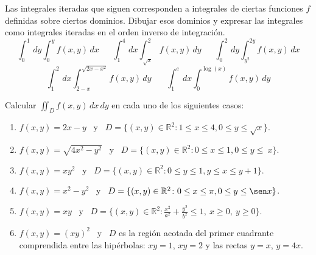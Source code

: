 \documentclass[11pt]{article}
\newcommand{\be}{\begin{enumerate}}
\newcommand{\ee}{\end{enumerate}}
\newcommand{\R}{\mathbb{R}}
\begin{document}
\begin{enumerate}
      \ee
\item Las integrales iteradas que siguen corresponden a integrales
  de ciertas funciones $f$ definidas sobre ciertos dominios. Dibujar
  esos dominios y expresar las integrales como integrales iteradas en
  el orden inverso de integraci\'{o}n. 
\[ 
\int_{0}^{1}\,dy \int_{0}^{y}f(x,y)\,dx \ \ \ \ \ \ \
\int_{1}^{4}\,dx \int_{\sqrt{x}}^{2}f(x,y)\,dy \ \ \ \ \ \ \
\int_{0}^{2}\,dy \int_{y^{2}}^{2y}f(x,y)\,dx 
\]
\[ 
\int_{1}^{2}\,dx \int_{2-x}^{\sqrt{2x-x^{2}}}f(x,y)\,dy \ \ \ \ \ \ \ \ 
\int_{1}^{e}\,dx \int_{0}^{\log(x)}f(x,y)\,dy   
\]
\item Calcular $\iint_{D}f(x,y)\,dx\,dy$ en cada uno de los siguientes
  casos: 
     \be
      \item $f(x,y)=2x-y $ \ y \ $D=\{ (x,y) \in \R^{2}\colon 1\leq x 
            \leq 4 , 0 \leq y \leq \sqrt{x} \}$.
      \item $f(x,y)=\sqrt{4x^{2}-y^{2}} $ \ y \ $D=\{ (x,y) \in 
            \R^{2}\colon 0\leq x \leq 1 ,      0 \leq y \leq \ x \}$. 
      \item $f(x,y)=xy^{2} $ \ y \ $D=\{ (x,y) \in \R^{2}\colon 0\leq
            y \leq 1 , y \leq x \leq  y+1 \}$.
      \item $f(x,y)=x^{2}-y^{2} $ \ y \ $D=\{ (x,y) \in \R^{2}\colon 
            0\leq x \leq \pi ,      0 \leq y \leq \sen x \}$. 
      \item $f(x,y)=xy $ \ y \ $D=\{ (x,y) \in \R^{2}: 
            \frac{x^{2}}{a^{2}}+\frac{y^{2}}{b^{2}}\leq 1,\ x \geq 0,\   y \geq 0 \}$.  
      \item $f(x,y)=(xy)^{2} $ \ y \ $D$ es la regi\'{o}n acotada del 
            primer cuadrante comprendida entre las hip\'erbolas:
            $xy=1$, $xy=2$ y las rectas $y=x$, $y=4x$. 
\end{enumerate}
\end{document}
